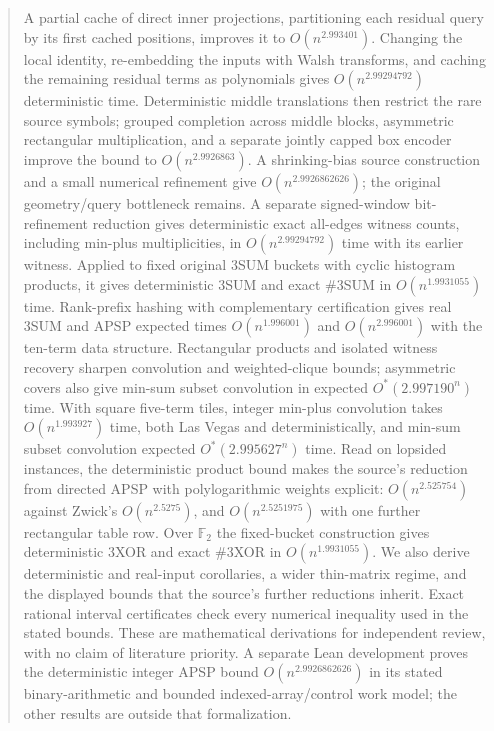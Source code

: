 \documentclass[11pt]{article}
\begin{document}
\begin{abstract}
A partial cache of direct inner projections, partitioning each residual
query by its first cached positions, improves it to $O(n^{2.993401})$.
Changing the local identity, re-embedding the inputs with Walsh transforms,
and caching the remaining residual terms as polynomials gives
$O(n^{2.99294792})$ deterministic time. Deterministic middle translations
then restrict the rare source symbols; grouped completion across middle
blocks, asymmetric rectangular multiplication, and a separate jointly
capped box encoder improve the bound to $O(n^{2.9926863})$.
A shrinking-bias source construction and a small numerical refinement
give $O(n^{2.9926862626})$; the original geometry/query bottleneck remains.
A separate signed-window
bit-refinement reduction gives deterministic exact all-edges witness
counts, including min-plus multiplicities, in $O(n^{2.99294792})$ time
with its earlier witness. Applied to
fixed original 3SUM buckets with cyclic histogram products, it gives
deterministic 3SUM and exact \#3SUM in $O(n^{1.9931055})$ time.
Rank-prefix hashing with complementary certification gives real 3SUM and
APSP expected times $O(n^{1.996001})$ and $O(n^{2.996001})$ with the
ten-term data structure.
Rectangular products and isolated witness recovery sharpen convolution
and weighted-clique bounds; asymmetric covers also give min-sum subset
convolution in expected $O^*(2.997190^n)$ time. With square five-term
tiles, integer min-plus convolution takes $O(n^{1.993927})$ time, both
Las Vegas and deterministically, and min-sum subset convolution expected
$O^*(2.995627^n)$ time. Read on lopsided instances, the deterministic
product bound makes the source's reduction from directed APSP with
polylogarithmic weights explicit: $O(n^{2.525754})$ against Zwick's
$O(n^{2.5275})$, and $O(n^{2.5251975})$ with one further rectangular table
row. Over $\mathbb F_2$ the fixed-bucket construction gives deterministic
3XOR and exact \#3XOR in $O(n^{1.9931055})$.
We also derive deterministic and real-input corollaries, a wider thin-matrix
regime, and the displayed bounds that the source's further reductions inherit. Exact rational interval certificates check every numerical inequality
used in the stated bounds. These are mathematical derivations for independent
review, with no claim of literature priority. A separate Lean development
proves the deterministic integer APSP bound $O(n^{2.9926862626})$ in its
stated binary-arithmetic and bounded indexed-array/control work model;
the other results are outside that formalization.
\end{abstract}
\end{document}
